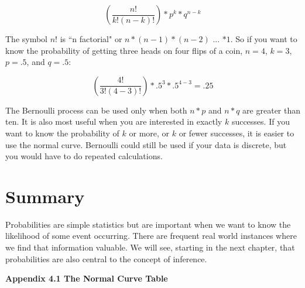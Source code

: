 \documentclass[11pt,openany]{book}\usepackage[]{graphicx}\usepackage[]{color}
\begin{document}
{\begin{grbox}
{\begin{equation}
 \label{eq_label5}
 \left(\frac{n!}{k!(n-k)!}\right) * p^k * q^{n-k}
\end{equation}

The symbol $n!$ is ``n factorial" or $n*(n-1)*(n-2)$ ... $* 1$.  So if you want to know the probability of getting three heads on four flips of a coin, $n=4$, $k=3$, $p=.5$, and $q=.5$:

\begin{equation}
  \label{eq_label6}
  \left(\frac{4!}{3!(4-3)!}\right) * .5^3 * .5^{4-3} = .25
\end{equation}

The Bernoulli process can be used only when both $n * p$ and $n * q$ are greater than ten.  It is also most useful when you are interested in exactly $k$ successes.  If you want to know the probability of $k$ or more, or $k$ or fewer successes, it is easier to use the normal curve.  Bernoulli could still be used if your data is discrete, but you would have to do repeated calculations.
}
\end{grbox}

\section{Summary}
Probabilities are simple statistics but are important when we want to know the likelihood of some event occurring.  There are frequent real world instances where we find that information valuable.  We will see, starting in the next chapter, that probabilities are also central to the concept of inference.

\newpage
\textbf{Appendix 4.1 The Normal Curve Table}

}
\end{document}
